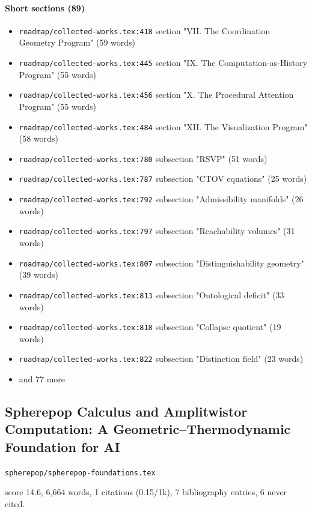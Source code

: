 \documentclass[11pt]{article}
\newcommand{\loc}[1]{{\small\color{muted}\texttt{#1}}}
\begin{document}
\paragraph{Short sections (89)}
\begin{itemize}
\item \loc{roadmap/\allowbreak{}collected-works.tex:418} section "VII. The Coordination Geometry Program" (59 words)
\item \loc{roadmap/\allowbreak{}collected-works.tex:445} section "IX. The Computation-as-History Program" (55 words)
\item \loc{roadmap/\allowbreak{}collected-works.tex:456} section "X. The Procedural Attention Program" (55 words)
\item \loc{roadmap/\allowbreak{}collected-works.tex:484} section "XII. The Visualization Program" (58 words)
\item \loc{roadmap/\allowbreak{}collected-works.tex:780} subsection "RSVP" (51 words)
\item \loc{roadmap/\allowbreak{}collected-works.tex:787} subsection "CTOV equations" (25 words)
\item \loc{roadmap/\allowbreak{}collected-works.tex:792} subsection "Admissibility manifolds" (26 words)
\item \loc{roadmap/\allowbreak{}collected-works.tex:797} subsection "Reachability volumes" (31 words)
\item \loc{roadmap/\allowbreak{}collected-works.tex:807} subsection "Distinguishability geometry" (39 words)
\item \loc{roadmap/\allowbreak{}collected-works.tex:813} subsection "Ontological deficit" (33 words)
\item \loc{roadmap/\allowbreak{}collected-works.tex:818} subsection "Collapse quotient" (19 words)
\item \loc{roadmap/\allowbreak{}collected-works.tex:822} subsection "Distinction field" (23 words)
\item[] {\color{muted}\small and 77 more}
\end{itemize}
\subsection{Spherepop Calculus and Amplitwistor Computation: A Geometric--Thermodynamic Foundation for AI}
\loc{spherepop/\allowbreak{}spherepop-foundations.tex}\par
score 14.6, 6,664 words, 1 citations (0.15/1k), 7 bibliography entries, 6 never cited.
\end{document}
